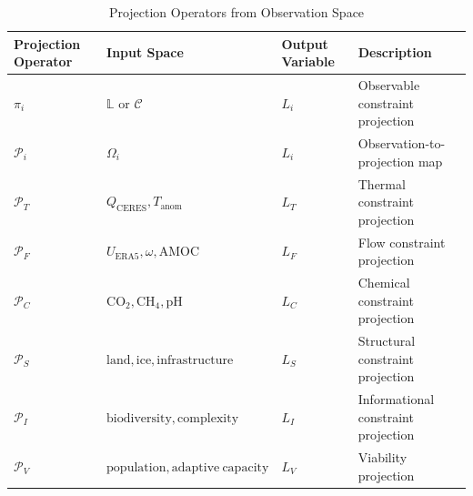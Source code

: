 \begin{table}
\centering
\caption{Projection Operators from Observation Space}
\label{tab:projection_operators}
\begin{tabular}{p{}p{}p{}p{}}
\hline
Projection Operator & Input Space & Output Variable & Description \\
\hline
\(\pi_i\) & \(\mathbb{L}\) or \(\mathcal{C}\) & \(L_i\) & Observable constraint projection \\
\(\mathcal{P}_i\) & \(\Omega_i\) & \(L_i\) & Observation-to-projection map \\
\(\mathcal{P}_T\) & \(Q_{\mathrm{CERES}},T_{\mathrm{anom}}\) & \(L_T\) & Thermal constraint projection \\
\(\mathcal{P}_F\) & \(U_{\mathrm{ERA5}},\omega,\mathrm{AMOC}\) & \(L_F\) & Flow constraint projection \\
\(\mathcal{P}_C\) & \(\mathrm{CO}_2,\mathrm{CH}_4,\mathrm{pH}\) & \(L_C\) & Chemical constraint projection \\
\(\mathcal{P}_S\) & \(\mathrm{land},\mathrm{ice},\mathrm{infrastructure}\) & \(L_S\) & Structural constraint projection \\
\(\mathcal{P}_I\) & \(\mathrm{biodiversity},\mathrm{complexity}\) & \(L_I\) & Informational constraint projection \\
\(\mathcal{P}_V\) & \(\mathrm{population},\mathrm{adaptive\ capacity}\) & \(L_V\) & Viability projection \\
\hline
\end{tabular}
\end{table}
